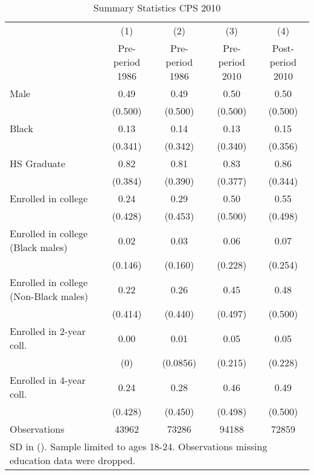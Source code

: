 \begin{table}[htbp]\centering
\caption{Summary Statistics CPS 2010}
\begin{tabular}{l*{4}{c}}
\hline\hline
                    &\multicolumn{1}{c}{(1)}&\multicolumn{1}{c}{(2)}&\multicolumn{1}{c}{(3)}&\multicolumn{1}{c}{(4)}\\
                    &\multicolumn{1}{c}{Pre-period 1986}&\multicolumn{1}{c}{Pre-period 1986}&\multicolumn{1}{c}{Pre-period 2010}&\multicolumn{1}{c}{Post-period 2010}\\
\hline
Male                &        0.49&        0.49&        0.50&        0.50\\
                    &     (0.500)&     (0.500)&     (0.500)&     (0.500)\\
[1em]
Black               &        0.13&        0.14&        0.13&        0.15\\
                    &     (0.341)&     (0.342)&     (0.340)&     (0.356)\\
[1em]
HS Graduate         &        0.82&        0.81&        0.83&        0.86\\
                    &     (0.384)&     (0.390)&     (0.377)&     (0.344)\\
[1em]
Enrolled in college &        0.24&        0.29&        0.50&        0.55\\
                    &     (0.428)&     (0.453)&     (0.500)&     (0.498)\\
[1em]
Enrolled in college (Black males)&        0.02&        0.03&        0.06&        0.07\\
                    &     (0.146)&     (0.160)&     (0.228)&     (0.254)\\
[1em]
Enrolled in college (Non-Black males)&        0.22&        0.26&        0.45&        0.48\\
                    &     (0.414)&     (0.440)&     (0.497)&     (0.500)\\
[1em]
Enrolled in 2-year coll.&        0.00&        0.01&        0.05&        0.05\\
                    &         (0)&    (0.0856)&     (0.215)&     (0.228)\\
[1em]
Enrolled in 4-year coll.&        0.24&        0.28&        0.46&        0.49\\
                    &     (0.428)&     (0.450)&     (0.498)&     (0.500)\\
\hline
Observations        &       43962&       73286&       94188&       72859\\
\hline\hline
\multicolumn{5}{l}{\footnotesize SD in (). Sample limited to ages 18-24. Observations missing education data were dropped.}\\
\end{tabular}
\end{table}
